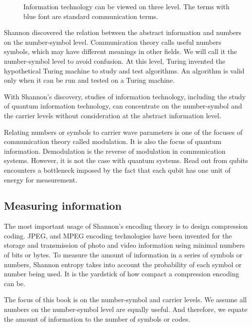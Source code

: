 \documentclass[oneside, letter, 12pt]{book}
\begin{document}
\begin{figure}
\begin{flushleft}
\begin{tikzpicture}
\end{tikzpicture}
\end{flushleft}
    \caption{Information technology can be viewed on three level. The terms with blue font are standard communication terms.}
\end{figure}

Shannon discovered the relation between the abstract information and numbers on the number-symbol level. Communication theory calls useful numbers symbols, which may have different meanings in other fields. We will call it the number-symbol level to avoid confusion. At this level, Turing invented the hypothetical Turing machine to study and test algorithms. An algorithm is valid only when it can be run and tested on a Turing machine.

With Shannon's discovery, studies of information technology, including the study of quantum information technology, can concentrate on the number-symbol and the carrier levels without consideration at the abstract information level.

Relating numbers or symbols to carrier wave parameters is one of the focuses of communication theory called modulation. It is also the focus of quantum information. Demodulation is the reverse of modulation in communication systems. However, it is not the case with quantum systems. Read out from qubits encounters a bottleneck imposed by the fact that each qubit has one unit of energy for measurement.

\subsection{Measuring information}
The most important usage of Shannon's encoding theory is to design compression coding. JPEG, and MPEG encoding technologies have been invented for the storage and transmission of photo and video information using minimal numbers of bits or bytes. To measure the amount of information in a series of symbols or numbers, Shannon entropy takes into account the probability of each symbol or number being used. It is the yardstick of how compact a compression encoding can be.

The focus of this book is on the number-symbol and carrier levels. We assume all numbers on the number-symbol level are equally useful. And therefore, we equate the amount of information to the number of symbols or codes.
\end{document}
